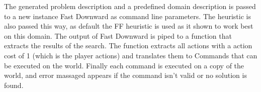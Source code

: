 	The generated problem description and a predefined domain description is passed to a new instance Fast Downward as command line parameters. The heuristic is also passed this way, as default the FF heuristic is used as it shown to work best on this domain. The output of Fast Downward is piped to a function that extracts the results of the search. The function extracts all actions with a action cost of 1 (which is the player actions) and translates them to Commands that can be executed on the world. Finally each command is executed on a copy of the world, and error massaged appears if the command isn't valid or no solution is found. 